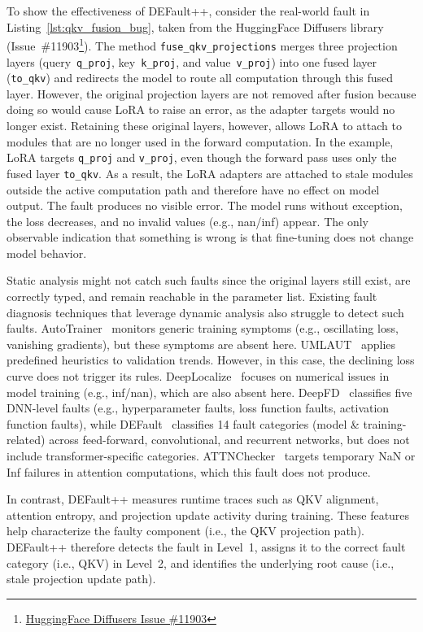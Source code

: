 To show the effectiveness of DEFault++, consider the real-world fault in Listing~\ref{lst:qkv_fusion_bug}, taken from the HuggingFace Diffusers library (Issue~\#11903\footnote{\href{https://github.com/huggingface/diffusers/issues/11903}{HuggingFace Diffusers Issue \#11903}}). The method \texttt{fuse\_qkv\_projections} merges three projection layers (query~\texttt{q\_proj},
key~\texttt{k\_proj}, and value~\texttt{v\_proj}) into one fused layer (\texttt{to\_qkv}) and redirects the model to route all computation through this fused layer. However, the original projection layers are not removed after fusion because doing so would cause LoRA to raise an error, as the adapter targets would no longer exist. Retaining these original layers, however, allows LoRA to attach to modules that are no longer used in the forward computation. In the example, LoRA targets \texttt{q\_proj} and \texttt{v\_proj}, even though the forward pass uses only the fused layer \texttt{to\_qkv}. As a result, the LoRA adapters are attached to stale modules outside the active computation path and therefore have no effect on model output. The fault produces no visible error. The model runs without exception, the loss decreases, and no invalid values (e.g., nan/inf) appear. The only observable indication that something is wrong is that fine-tuning does not change model behavior.

Static analysis might not catch such faults since the original layers still exist, are correctly typed, and remain reachable in the parameter list. Existing fault diagnosis techniques that leverage dynamic analysis also struggle to detect such faults. AutoTrainer~\cite{autotrainer} monitors generic training symptoms (e.g., oscillating loss, vanishing gradients), but these symptoms are absent here. UMLAUT~\cite{umlaut} applies predefined heuristics to validation trends. However, in this case, the declining loss curve does not trigger its rules. DeepLocalize~\cite{deeplocalize} focuses on numerical issues in model training (e.g., inf/nan), which are also absent here. DeepFD~\cite{deepfd} classifies five DNN-level faults (e.g., hyperparameter faults, loss function faults, activation function faults), while DEFault~\cite{default} classifies 14 fault categories (model \& training-related) across feed-forward, convolutional, and recurrent networks, but does not include transformer-specific categories. ATTNChecker~\cite{liang2025attnchecker} targets temporary NaN or Inf failures in attention computations, which this fault does not produce.

In contrast, DEFault++ measures runtime traces such as QKV alignment, attention entropy, and projection update activity during training. These features help characterize the faulty component (i.e., the QKV projection path). DEFault++ therefore detects the fault in Level~1, assigns it to the correct fault category (i.e., QKV) in Level~2, and identifies the underlying root cause (i.e., stale projection update path).

